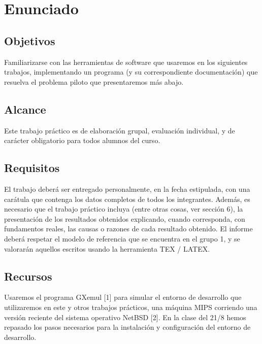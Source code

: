 \documentclass[a4paper,11pt, margin=1in]{article}
\begin{document}
\section{Enunciado}


\subsection{Objetivos}
Familiarizarse con las herramientas de software que usaremos en los siguientes trabajos, implementando un programa (y su correspondiente documentación) que resuelva el problema piloto que presentaremos más abajo.

\subsection{Alcance}
Este trabajo práctico es de elaboración grupal, evaluación individual, y de
carácter obligatorio para todos alumnos del curso.

\subsection{Requisitos}
El trabajo deberá ser entregado personalmente, en la fecha estipulada, con
una carátula que contenga los datos completos de todos los integrantes.
Además, es necesario que el trabajo práctico incluya (entre otras cosas, ver
sección 6), la presentación de los resultados obtenidos explicando, cuando corresponda, con fundamentos reales, las causas o razones de cada resultado obtenido.
El informe deberá respetar el modelo de referencia que se encuentra en el
grupo 1, y se valorarán aquellos escritos usando la herramienta TEX / LATEX.

\subsection{Recursos}
Usaremos el programa GXemul [1] para simular el entorno de desarrollo que
utilizaremos en este y otros trabajos prácticos, una máquina MIPS corriendo
una versión reciente del sistema operativo NetBSD [2].
En la clase del 21/8 hemos repasado los pasos necesarios para la instalación
y configuración del entorno de desarrollo.
\end{document}
